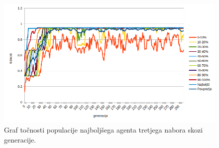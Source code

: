 %

\begin{figure}[H]
    \begin{center}
        \includegraphics[width=13cm]{iris/3/acc}
    \end{center}
    \caption{Graf točnosti populacije najboljšega agenta tretjega nabora skozi generacije.}
    \label{fig:iris_acc_3}
\end{figure}

